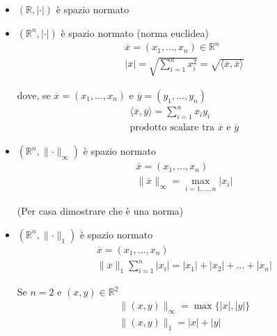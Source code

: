 \begin{exbar}
\begin{itemize}
	\item $(\mathbb{R}, |\cdot|)$ è spazio normato
	
	\item $(\mathbb{R}^n, |\cdot|)$ è spazio normato (norma euclidea)
	\begin{gather*}
		\overline{x} = (x_1,...,x_n) \in \mathbb{R}^n
		\\ \big| \overline{x} \big| = \sqrt{\sum_{i=1}^{n }x_i^2}= \sqrt{ \langle \overline{x}, \overline{x} \rangle}
	\end{gather*} 
	
	dove, se $\overline{x} = (x_1,...,x_n)$ e $\overline{y} = (y_1,...,y_n)$
	\begin{gather*}
	\langle  \overline{x}, \overline{y} \rangle = \sum_{i=1}^{n} x_i y_i 
	\\
	\text{prodotto scalare tra } \overline{x} \text{ e } \overline{y}
	\end{gather*}

	\item $(\mathbb{R}^n, \parallel \cdot \parallel_{\infty})$ è spazio normato
	\begin{gather*}
		\overline{x} = (x_1,...,x_n) 
		\\
		\parallel \overline{x} \parallel_\infty = \max_{i=1,...,n} |x_i|
	\end{gather*}
	
	(Per casa dimostrare che è una norma)
	
	\item $(\mathbb{R}^n,\parallel\cdot\parallel_1)$ è spazio normato
	\begin{gather*}
		\overline{x} = (x_1,...,x_n)
		\\
		\parallel \overline{x} \parallel_1 \sum_{i=1}^{n} |x_i| = |x_1| + |x_2| + \ldots + |x_n|
	\end{gather*}
	
	
	Se $n=2$ e $(x,y)\in \mathbb{R}^2$
	\begin{gather*}
		\parallel (x,y) \parallel_\infty = \max \{ |x|,|y| \}
		\\
		\parallel (x,y) \parallel_1 = |x| + |y|
	\end{gather*}
	

\end{itemize}
\end{exbar}
